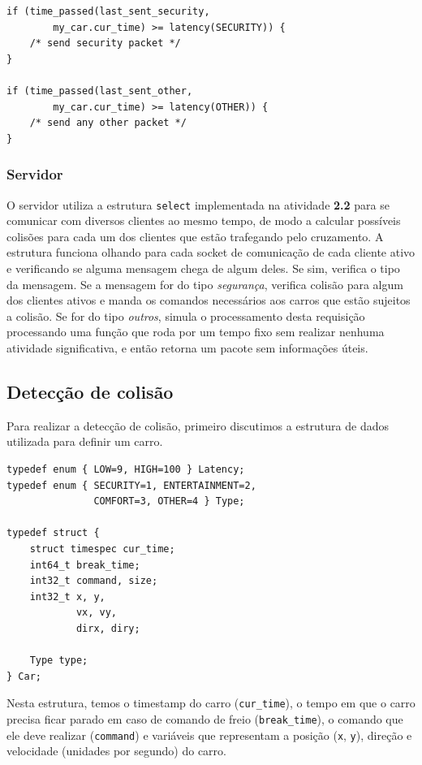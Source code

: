 \documentclass[10pt,twocolumn,letterpaper]{article}
\begin{document}
\begin{lstlisting}[caption={Demonstração do código para o envio de pacotes}, label=Algorithm]
if (time_passed(last_sent_security, 
        my_car.cur_time) >= latency(SECURITY)) {
    /* send security packet */
}

if (time_passed(last_sent_other, 
        my_car.cur_time) >= latency(OTHER)) {
    /* send any other packet */
}
\end{lstlisting}

    \subsubsection{Servidor}
        O servidor utiliza a estrutura \texttt{select} implementada na atividade \textbf{2.2} para se comunicar com diversos clientes ao mesmo tempo, de modo a calcular possíveis colisões para cada um dos clientes que estão trafegando pelo cruzamento. A estrutura funciona olhando para cada socket de comunicação de cada cliente ativo e verificando se alguma mensagem chega de algum deles. Se sim, verifica o tipo da mensagem. Se a mensagem for do tipo \textit{segurança}, verifica colisão para algum dos clientes ativos e manda os comandos necessários aos carros que estão sujeitos a colisão. Se for do tipo \textit{outros}, simula o processamento desta requisição processando uma função que roda por um tempo fixo sem realizar nenhuma atividade significativa, e então retorna um pacote sem informações úteis.
            
\subsection{Detecção de colisão}
    Para realizar a detecção de colisão, primeiro discutimos a estrutura de dados utilizada para definir um carro.

\begin{lstlisting}[caption={Estrutura utilizada para a descrição de um carro}, label=Algorithm]
typedef enum { LOW=9, HIGH=100 } Latency;
typedef enum { SECURITY=1, ENTERTAINMENT=2, 
               COMFORT=3, OTHER=4 } Type;

typedef struct {
    struct timespec cur_time;
    int64_t break_time;
    int32_t command, size; 
    int32_t x, y, 
            vx, vy, 
            dirx, diry;

    Type type;
} Car;
\end{lstlisting}

    Nesta estrutura, temos o timestamp do carro (\texttt{cur\_time}), o tempo em que o carro precisa ficar parado em caso de comando de freio (\texttt{break\_time}), o comando que ele deve realizar (\texttt{command}) e variáveis que representam a posição (\texttt{x}, \texttt{y}), direção e velocidade (unidades por segundo) do carro.
\end{document}
